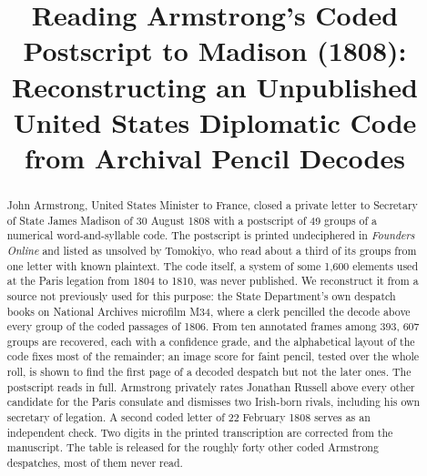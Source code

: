 \documentclass[]{interact}
\begin{document}

\title{Reading Armstrong's Coded Postscript to Madison (1808): Reconstructing an Unpublished United States Diplomatic Code from Archival Pencil Decodes}

\maketitle

\author{
}

\begin{abstract}
John Armstrong, United States Minister to France, closed a private letter to Secretary of State James Madison of 30 August 1808 with a postscript of 49 groups of a numerical word-and-syllable code. The postscript is printed undeciphered in \emph{Founders Online} and listed as unsolved by Tomokiyo, who read about a third of its groups from one letter with known plaintext. The code itself, a system of some 1,600 elements used at the Paris legation from 1804 to 1810, was never published. We reconstruct it from a source not previously used for this purpose: the State Department's own despatch books on National Archives microfilm M34, where a clerk pencilled the decode above every group of the coded passages of 1806. From ten annotated frames among 393, 607 groups are recovered, each with a confidence grade, and the alphabetical layout of the code fixes most of the remainder; an image score for faint pencil, tested over the whole roll, is shown to find the first page of a decoded despatch but not the later ones. The postscript reads in full. Armstrong privately rates Jonathan Russell above every other candidate for the Paris consulate and dismisses two Irish-born rivals, including his own secretary of legation. A second coded letter of 22 February 1808 serves as an independent check. Two digits in the printed transcription are corrected from the manuscript. The table is released for the roughly forty other coded Armstrong despatches, most of them never read.
\end{abstract}
\end{document}
